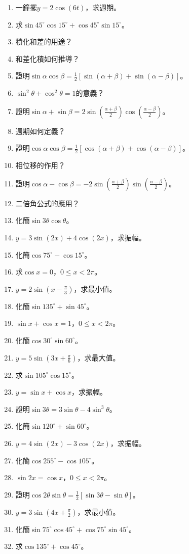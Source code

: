 \begin{enumerate}[label=\arabic*.]
    \item 一鐘擺$y = 2 \cos(6t)$，求週期。
    \item 求$\sin 45^\circ \cos 15^\circ + \cos 45^\circ \sin 15^\circ$。
    \item 積化和差的用途？
    \item 和差化積如何推導？
    \item 證明$\sin \alpha \cos \beta = \frac{1}{2} [\sin(\alpha + \beta) + \sin(\alpha - \beta)]$。
    \item $\sin^2 \theta + \cos^2 \theta = 1$的意義？
    \item 證明$\sin \alpha + \sin \beta = 2 \sin\left(\frac{\alpha + \beta}{2}\right) \cos\left(\frac{\alpha - \beta}{2}\right)$。
    \item 週期如何定義？
    \item 證明$\cos \alpha \cos \beta = \frac{1}{2} [\cos(\alpha + \beta) + \cos(\alpha - \beta)]$。
    \item 相位移的作用？
    \item 證明$\cos \alpha - \cos \beta = -2 \sin\left(\frac{\alpha + \beta}{2}\right) \sin\left(\frac{\alpha - \beta}{2}\right)$。
    \item 二倍角公式的應用？
    \item 化簡$\sin 3\theta \cos \theta$。
    \item $y = 3 \sin(2x) + 4 \cos(2x)$，求振幅。
    \item 化簡$\cos 75^\circ - \cos 15^\circ$。
    \item 求$\cos x = 0$，$0 \leq x < 2\pi$。
    \item $y = 2 \sin(x - \frac{\pi}{3})$，求最小值。
    \item 化簡$\sin 135^\circ + \sin 45^\circ$。
    \item $\sin x + \cos x = 1$，$0 \leq x < 2\pi$。
    \item 化簡$\cos 30^\circ \sin 60^\circ$。
    \item $y = 5 \sin(3x + \frac{\pi}{6})$，求最大值。
    \item 求$\sin 105^\circ \cos 15^\circ$。
    \item $y = \sin x + \cos x$，求振幅。
    \item 證明$\sin 3\theta = 3 \sin \theta - 4 \sin^3 \theta$。
    \item 化簡$\sin 120^\circ + \sin 60^\circ$。
    \item $y = 4 \sin(2x) - 3 \cos(2x)$，求振幅。
    \item 化簡$\cos 255^\circ - \cos 105^\circ$。
    \item $\sin 2x = \cos x$，$0 \leq x < 2\pi$。
    \item 證明$\cos 2\theta \sin \theta = \frac{1}{2} [\sin 3\theta - \sin \theta]$。
    \item $y = 3 \sin(4x + \frac{\pi}{2})$，求最小值。
    \item 化簡$\sin 75^\circ \cos 45^\circ + \cos 75^\circ \sin 45^\circ$。
    \item 求$\cos 135^\circ + \cos 45^\circ$。
\end{enumerate}